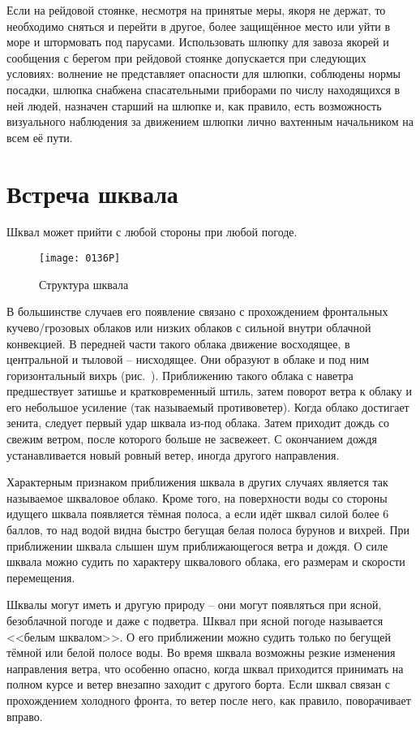 Если на рейдовой стоянке, несмотря на принятые меры, якоря не держат,
то необходимо сняться и перейти в другое, более защищённое место или
уйти в море и штормовать под парусами. Использовать шлюпку для завоза
якорей и сообщения с берегом при рейдовой стоянке допускается при
следующих условиях: волнение не представляет опасности для шлюпки,
соблюдены нормы посадки, шлюпка снабжена спасательными приборами по
числу находящихся в ней людей, назначен старший на шлюпке и, как
правило, есть возможность визуального наблюдения за движением шлюпки
лично вахтенным начальником на всем её пути.

\section{Встреча шквала}

Шквал может прийти с любой стороны при любой погоде.

\begin{figure*}[!htb]
  \centering{}
  \texttt{[image: 0136P]}
  \caption{Структура шквала}
  \label{fig:136}
\end{figure*}

В большинстве случаев его появление связано с прохождением фронтальных
кучево\-/грозовых облаков или низких облаков с сильной внутри облачной
конвекцией. В передней части такого облака движение восходящее, в
центральной и тыловой \--- нисходящее. Они образуют в облаке и под ним
горизонтальный вихрь (рис.~). Приближению такого облака с
наветра предшествует затишье и кратковременный штиль, затем поворот
ветра к облаку и его небольшое усиление (так называемый
противоветер). Когда облако достигает зенита, следует первый удар
шквала из-под облака. Затем приходит дождь со свежим ветром, после
которого больше не засвежеет. С окончанием дождя устанавливается новый
ровный ветер, иногда другого направления.

Характерным признаком приближения шквала в других случаях является так
называемое шкваловое облако. Кроме того, на поверхности воды со
стороны идущего шквала появляется тёмная полоса, а если идёт шквал
силой более 6 баллов, то над водой видна быстро бегущая белая
полоса бурунов и вихрей. При приближении шквала слышен шум
приближающегося ветра и дождя. О силе шквала можно судить по характеру
шквалового облака, его размерам и скорости перемещения.

Шквалы могут иметь и другую природу \--- они могут появляться при
ясной, безоблачной погоде и даже с подветра. Шквал при ясной погоде
называется <<белым
шквалом>>. О его
приближении можно судить только по бегущей тёмной или белой полосе
воды. Во время шквала возможны резкие изменения направления ветра, что
особенно опасно, когда шквал приходится принимать на полном курсе и
ветер внезапно заходит с другого борта. Если шквал связан с
прохождением холодного фронта, то ветер после него, как правило,
поворачивает вправо.

